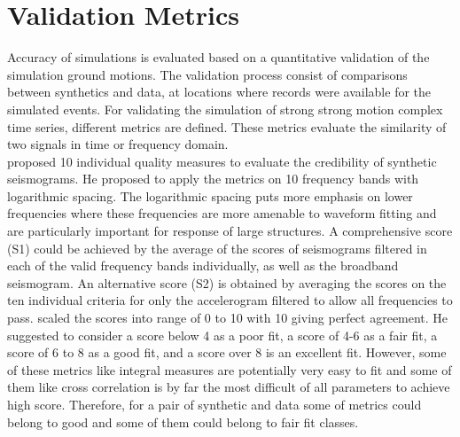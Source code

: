 
\section{Validation Metrics} \label{validation_metrics}

Accuracy of simulations is evaluated based on a quantitative validation of the simulation ground motions. The validation process consist of comparisons between synthetics and data, at locations where records were available for the simulated events. For validating the simulation of strong strong motion complex time series, different metrics are defined. These metrics evaluate the similarity of two signals in time or frequency domain. \\
\citet{Anderson_2004_Proc} proposed 10 individual quality measures to evaluate the credibility of synthetic seismograms.  He proposed to apply the metrics on 10 frequency bands with logarithmic spacing. The logarithmic spacing puts more emphasis on lower frequencies where these frequencies are more amenable to waveform fitting and are particularly important for response of large structures. A comprehensive score (S1) could be achieved by the average of the scores of seismograms filtered in each of the valid frequency bands individually, as well as the broadband seismogram. An alternative score (S2) is obtained by averaging the scores on the ten individual criteria for only the accelerogram filtered to allow all frequencies to pass. \citet{Anderson_2004_Proc} scaled the scores into range of 0 to 10 with 10 giving perfect agreement. He suggested to consider a score below 4 as a poor fit, a score of 4-6 as a fair fit, a score of 6 to 8 as a good fit, and a score over 8 is an excellent fit. However, some of these metrics like integral measures are potentially very easy to fit and some of them like cross correlation is by far the most difficult of all parameters to achieve high score. Therefore, for a pair of synthetic and data some of metrics could belong to good and some of them could belong to fair fit classes.\\

